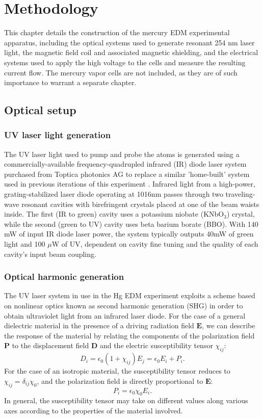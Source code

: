 \documentclass [10pt, twoside] {uwthesis}[2012/04/02]
\begin{document}
\chapter{Methodology}
This chapter details the construction of the mercury EDM experimental apparatus, including the optical systems used to generate resonant 254 nm laser light, the magnetic field coil and associated magnetic shielding, and the electrical systems used to apply the high voltage to the cells and measure the resulting current flow.
The mercury vapor cells are not included, as they are of such importance to warrant a separate chapter.
\section{Optical setup}
\subsection{UV laser light generation}
The UV laser light used to pump and probe the atoms is generated using a commercially-available frequency-quadrupled infrared (IR) diode laser system purchased from Toptica photonics AG to replace a similar 'home-built' system used in previous iterations of this experiment \cite{2001_Hg_EDM, 2009_Hg_EDM}. Infrared light from a high-power, grating-stabilized laser diode operating at 1016nm passes through two traveling-wave resonant cavities with birefringent crystals placed at one of the beam waists inside. The first (IR to green) cavity uses a potassium niobate (KNbO$_3$) crystal, while the second (green to UV) cavity uses beta barium borate (BBO). With 140 mW of input IR diode laser power, the system typically outputs 40mW of green light and 100 $\mu$W of UV, dependent on cavity fine tuning and the quality of each cavity's input beam coupling. 

\subsection{Optical harmonic generation}
The UV laser system in use in the Hg EDM experiment exploits a scheme based on nonlinear optics known as second harmonic generation (SHG) in order to obtain ultraviolet light from an infrared laser diode. For the case of a general dielectric material in the presence of a driving radiation field $\mathbf{E}$, we can describe the response of the material by relating the components of the polarization field $\mathbf{P}$ to the displacement field $\mathbf{D}$ and the electric susceptibility tensor $\chi_{ij}$: 
\begin{equation} D_i = \epsilon_0 (1+\chi_{ij})E_j = \epsilon_0E_i + P_i.\end{equation} For the case of an isotropic material, the susceptibility tensor reduces to $\chi_{ij} = \delta_{ij} \chi_0$, and the polarization field is directly proportional to $\mathbf{E}$: 
\begin{equation} P_i = \epsilon_0\chi_0E_i. \end{equation} 
In general, the susceptibility tensor may take on different values along various axes according to the properties of the material involved.
	
\end{document}
